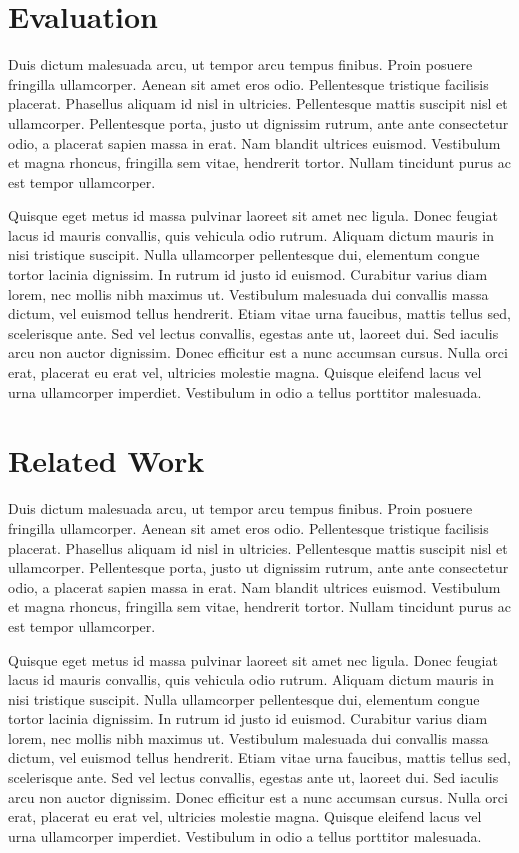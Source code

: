\documentclass[conference]{IEEEtran}
\begin{document}
\section{Evaluation}

Duis dictum malesuada arcu, ut tempor arcu tempus finibus. Proin posuere fringilla ullamcorper. Aenean sit amet eros odio. Pellentesque tristique facilisis placerat. Phasellus aliquam id nisl in ultricies. Pellentesque mattis suscipit nisl et ullamcorper. Pellentesque porta, justo ut dignissim rutrum, ante ante consectetur odio, a placerat sapien massa in erat. Nam blandit ultrices euismod. Vestibulum et magna rhoncus, fringilla sem vitae, hendrerit tortor. Nullam tincidunt purus ac est tempor ullamcorper.

Quisque eget metus id massa pulvinar laoreet sit amet nec ligula. Donec feugiat lacus id mauris convallis, quis vehicula odio rutrum. Aliquam dictum mauris in nisi tristique suscipit. Nulla ullamcorper pellentesque dui, elementum congue tortor lacinia dignissim. In rutrum id justo id euismod. Curabitur varius diam lorem, nec mollis nibh maximus ut. Vestibulum malesuada dui convallis massa dictum, vel euismod tellus hendrerit. Etiam vitae urna faucibus, mattis tellus sed, scelerisque ante. Sed vel lectus convallis, egestas ante ut, laoreet dui. Sed iaculis arcu non auctor dignissim. Donec efficitur est a nunc accumsan cursus. Nulla orci erat, placerat eu erat vel, ultricies molestie magna. Quisque eleifend lacus vel urna ullamcorper imperdiet. Vestibulum in odio a tellus porttitor malesuada.

\section{Related Work}

Duis dictum malesuada arcu, ut tempor arcu tempus finibus. Proin posuere fringilla ullamcorper. Aenean sit amet eros odio. Pellentesque tristique facilisis placerat. Phasellus aliquam id nisl in ultricies. Pellentesque mattis suscipit nisl et ullamcorper. Pellentesque porta, justo ut dignissim rutrum, ante ante consectetur odio, a placerat sapien massa in erat. Nam blandit ultrices euismod. Vestibulum et magna rhoncus, fringilla sem vitae, hendrerit tortor. Nullam tincidunt purus ac est tempor ullamcorper.

Quisque eget metus id massa pulvinar laoreet sit amet nec ligula. Donec feugiat lacus id mauris convallis, quis vehicula odio rutrum. Aliquam dictum mauris in nisi tristique suscipit. Nulla ullamcorper pellentesque dui, elementum congue tortor lacinia dignissim. In rutrum id justo id euismod. Curabitur varius diam lorem, nec mollis nibh maximus ut. Vestibulum malesuada dui convallis massa dictum, vel euismod tellus hendrerit. Etiam vitae urna faucibus, mattis tellus sed, scelerisque ante. Sed vel lectus convallis, egestas ante ut, laoreet dui. Sed iaculis arcu non auctor dignissim. Donec efficitur est a nunc accumsan cursus. Nulla orci erat, placerat eu erat vel, ultricies molestie magna. Quisque eleifend lacus vel urna ullamcorper imperdiet. Vestibulum in odio a tellus porttitor malesuada.
\end{document}

